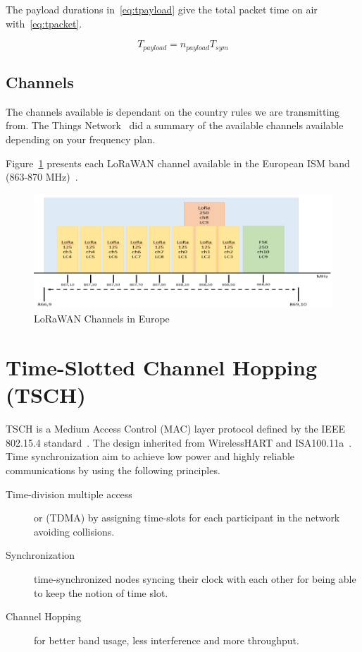 The payload durations in~\ref{eq:tpayload} give the total packet time on air
with~\ref{eq:tpacket}.

\begin{equation}
  \label{eq:tpayload}
  T_{payload} = n_{payload} T_{sym}
\end{equation}


\subsection{Channels}

The channels available is dependant on the country rules we are transmitting from.
The Things Network~\cite{ttnfrequencyplans} did a summary of the available
channels available depending on your frequency plan.

Figure~\ref{fig:channels} presents each LoRaWAN channel available in the
European ISM band (863-870 MHz)~\cite{Polonelli_2019}.

\begin{figure}[H]
  \centering
  \includegraphics[width=\textwidth]{thesis.tex/chapters/context/fig/channels.png}
  \caption{LoRaWAN Channels in Europe\cite{Polonelli_2019}\label{fig:channels}}
\end{figure}


\section{Time-Slotted Channel Hopping (TSCH)}

TSCH is a Medium Access Control (MAC) layer protocol defined by the IEEE
802.15.4 standard~\cite{rfc7554}.
The design inherited from WirelessHART and
ISA100.11a~\cite{Duquennoy2017TSCHA6}.
Time synchronization aim to achieve low power and highly reliable
communications by using the following principles.

\begin{description}
  \item[Time-division multiple access] or (TDMA) by assigning time-slots for each
    participant in the network avoiding collisions.
  \item[Synchronization] time-synchronized nodes syncing their clock with each
    other for being able to keep the notion of time slot.
  \item[Channel Hopping] for better band usage, less interference and more
    throughput.
\end{description}

